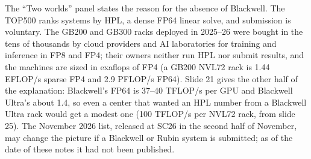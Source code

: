 \documentclass[11pt,letterpaper]{article}
\begin{document}
The ``Two worlds'' panel states the reason for the absence of Blackwell. The TOP500 ranks systems by HPL, a dense FP64 linear solve, and submission is voluntary. The GB200 and GB300 racks deployed in 2025--26 were bought in the tens of thousands by cloud providers and AI laboratories for training and inference in FP8 and FP4; their owners neither run HPL nor submit results, and the machines are sized in exaflops of FP4 (a GB200 NVL72 rack is 1.44 EFLOP/s sparse FP4 and 2.9 PFLOP/s FP64). Slide 21 gives the other half of the explanation: Blackwell's FP64 is 37--40 TFLOP/s per GPU and Blackwell Ultra's about 1.4, so even a center that wanted an HPL number from a Blackwell Ultra rack would get a modest one (100 TFLOP/s per NVL72 rack, from slide 25). The November 2026 list, released at SC26 in the second half of November, may change the picture if a Blackwell or Rubin system is submitted; as of the date of these notes it had not been published.
\end{document}
